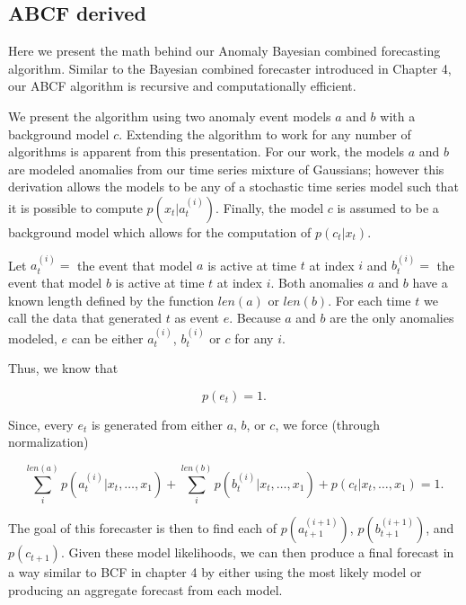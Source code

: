 \subsection{ABCF derived}
\label{sec:abcf}
Here we present the math behind our Anomaly Bayesian combined forecasting algorithm.  Similar to the Bayesian combined forecaster introduced in Chapter 4, our ABCF algorithm is recursive and computationally efficient.  

We present the algorithm using two anomaly event models $a$ and $b$ with a background model $c$.  Extending the algorithm to work for any number of algorithms is apparent from this presentation.  For our work, the models $a$ and $b$ are modeled anomalies from our time series mixture of Gaussians; however this derivation allows the models to be any of a stochastic time series model such that it is possible to compute $p(x_{t} | a^{(i)}_{t})$.  Finally, the model $c$ is assumed to be a background model which allows for the computation of $p(c_{t}|x_{t})$.  

Let $a_{t}^{(i)} = $ the event that model $a$ is active at time $t$ at index $i$ and $b_{t}^{(i)} = $ the event that model $b$ is active at time $t$ at index $i$.  Both anomalies $a$ and $b$ have a known length defined by the function $len(a)$ or $len(b)$.  For each time $t$ we call the data that generated $t$ as event $e$.  Because $a$ and $b$ are the only anomalies modeled, $e$ can be either ${a^{(i)}_{t}}$, ${b^{(i)}_{t}}$ or $c$ for any $i$.

Thus, we know that

\begin{equation}
p(e_{t}) = 1.
\end{equation}

Since, every $e_{t}$ is generated from either $a$, $b$, or $c$, we force (through normalization)

\begin{equation}
\sum_{i}^{len(a)} p(a_{t}^{(i)}|x_{t}, \ldots, x_{1}) + \sum_{i}^{len(b)} p(b_{t}^{(i)}|x_{t}, \ldots, x_{1}) + p(c_{t}|x_{t}, \ldots, x_{1}) = 1.
\label{eq:pabc}
\end{equation}

The goal of this forecaster is then to find each of $p(a_{t + 1}^{(i + 1)})$, $p(b_{t + 1}^{(i + 1)})$, and $p(c_{t + 1}).$  Given these model likelihoods, we can then produce a final forecast in a way similar to BCF in chapter 4 by either using the most likely model or producing an aggregate forecast from each model.


